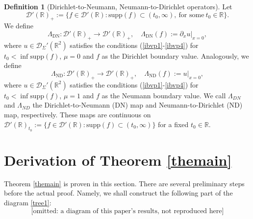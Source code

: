 \documentclass[10pt,a4paper]{article}
\theoremstyle{plain}
\theoremstyle{definition}
\newtheorem{definition}[theorem]{Definition}
\theoremstyle{remark}
\numberwithin{equation}{section}
\newcommand{\R}{\mathbb{R}}
\newcommand{\DN}{\Lambda_{\text{DN}}}
\newcommand{\ND}{\Lambda_{\text{ND}}}
\begin{document}
\begin{definition}[Dirichlet-to-Neumann, Neumann-to-Dirichlet operators]\label{DN-def}
Let $$\mathcal{D}'(\R)_{+} := \{ f \in \mathcal{D}'(\R) : \text{supp} (f) \subset (t_0,\infty), \ \text{for some} \ t_0 \in \R \}.$$
%
We define
\[
\DN  :  \mathcal{D}'(\R)_{+} \to  \mathcal{D}'(\R)_{+}, \quad  
 \DN (f) := \partial_x u |_{x=0},
 \]
  where  $u \in \mathcal{D}_\Sigma'(\R^2)$ satisfies the conditions (\ref{ibvp1}-\ref{ibvp4})  for $t_0 < \inf \text{supp} (f)$, $\mu=0$ and $f$ as the Dirichlet boundary value.  
Analogously, we define 
\[
\ND :  \mathcal{D}'(\R)_{+} \to  \mathcal{D}'(\R)_{+}, \quad  
\ND (f) :=  u |_{x=0}, 
\]
where  $u  \in \mathcal{D}_\Sigma'(\R^2)$ satisfies  the conditions (\ref{ibvp1}-\ref{ibvp4})  for $t_0 < \inf \text{supp} (f)$, $\mu=1$ and $f$ as the Neumann boundary value. 
We call $\Lambda_{DN}$ and $\Lambda_{ND}$ the Dirichlet-to-Neumann (DN) map  and Neumann-to-Dirichlet (ND) map, respectively. 
These maps are continuous on $\mathcal{D}'(\R)_{t_0} := \{ f \in \mathcal{D}'(\R) : \text{supp} (f) \subset (t_0,\infty) \}$ for a fixed $t_0 \in \R$. 
\end{definition}





\section{Derivation of Theorem \ref{themain}}\label{derivation-section}




Theorem \ref{themain} is proven in this section. There are several preliminary steps before the actual proof. 
Namely, we shall construct the following part of the diagram \eqref{tree1}:
\[
\mbox{[omitted: a diagram of this paper's results, not reproduced here]}
\]
\end{document}
